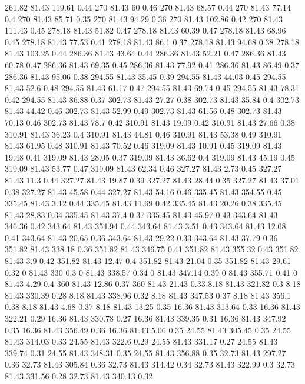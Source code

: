 261.82	81.43	119.61	0.44
270	81.43	60	0.46
270	81.43	68.57	0.44
270	81.43	77.14	0.4
270	81.43	85.71	0.35
270	81.43	94.29	0.36
270	81.43	102.86	0.42
270	81.43	111.43	0.45
278.18	81.43	51.82	0.47
278.18	81.43	60.39	0.47
278.18	81.43	68.96	0.45
278.18	81.43	77.53	0.41
278.18	81.43	86.1	0.37
278.18	81.43	94.68	0.38
278.18	81.43	103.25	0.44
286.36	81.43	43.64	0.44
286.36	81.43	52.21	0.47
286.36	81.43	60.78	0.47
286.36	81.43	69.35	0.45
286.36	81.43	77.92	0.41
286.36	81.43	86.49	0.37
286.36	81.43	95.06	0.38
294.55	81.43	35.45	0.39
294.55	81.43	44.03	0.45
294.55	81.43	52.6	0.48
294.55	81.43	61.17	0.47
294.55	81.43	69.74	0.45
294.55	81.43	78.31	0.42
294.55	81.43	86.88	0.37
302.73	81.43	27.27	0.38
302.73	81.43	35.84	0.4
302.73	81.43	44.42	0.46
302.73	81.43	52.99	0.49
302.73	81.43	61.56	0.48
302.73	81.43	70.13	0.46
302.73	81.43	78.7	0.42
310.91	81.43	19.09	0.42
310.91	81.43	27.66	0.38
310.91	81.43	36.23	0.4
310.91	81.43	44.81	0.46
310.91	81.43	53.38	0.49
310.91	81.43	61.95	0.48
310.91	81.43	70.52	0.46
319.09	81.43	10.91	0.45
319.09	81.43	19.48	0.41
319.09	81.43	28.05	0.37
319.09	81.43	36.62	0.4
319.09	81.43	45.19	0.45
319.09	81.43	53.77	0.47
319.09	81.43	62.34	0.46
327.27	81.43	2.73	0.45
327.27	81.43	11.3	0.44
327.27	81.43	19.87	0.39
327.27	81.43	28.44	0.35
327.27	81.43	37.01	0.38
327.27	81.43	45.58	0.44
327.27	81.43	54.16	0.46
335.45	81.43	354.55	0.45
335.45	81.43	3.12	0.44
335.45	81.43	11.69	0.42
335.45	81.43	20.26	0.38
335.45	81.43	28.83	0.34
335.45	81.43	37.4	0.37
335.45	81.43	45.97	0.43
343.64	81.43	346.36	0.42
343.64	81.43	354.94	0.44
343.64	81.43	3.51	0.43
343.64	81.43	12.08	0.41
343.64	81.43	20.65	0.36
343.64	81.43	29.22	0.33
343.64	81.43	37.79	0.36
351.82	81.43	338.18	0.36
351.82	81.43	346.75	0.41
351.82	81.43	355.32	0.43
351.82	81.43	3.9	0.42
351.82	81.43	12.47	0.4
351.82	81.43	21.04	0.35
351.82	81.43	29.61	0.32
0	81.43	330	0.3
0	81.43	338.57	0.34
0	81.43	347.14	0.39
0	81.43	355.71	0.41
0	81.43	4.29	0.4
360	81.43	12.86	0.37
360	81.43	21.43	0.33
8.18	81.43	321.82	0.3
8.18	81.43	330.39	0.28
8.18	81.43	338.96	0.32
8.18	81.43	347.53	0.37
8.18	81.43	356.1	0.38
8.18	81.43	4.68	0.37
8.18	81.43	13.25	0.35
16.36	81.43	313.64	0.33
16.36	81.43	322.21	0.29
16.36	81.43	330.78	0.27
16.36	81.43	339.35	0.31
16.36	81.43	347.92	0.35
16.36	81.43	356.49	0.36
16.36	81.43	5.06	0.35
24.55	81.43	305.45	0.35
24.55	81.43	314.03	0.33
24.55	81.43	322.6	0.29
24.55	81.43	331.17	0.27
24.55	81.43	339.74	0.31
24.55	81.43	348.31	0.35
24.55	81.43	356.88	0.35
32.73	81.43	297.27	0.36
32.73	81.43	305.84	0.36
32.73	81.43	314.42	0.34
32.73	81.43	322.99	0.3
32.73	81.43	331.56	0.28
32.73	81.43	340.13	0.32
